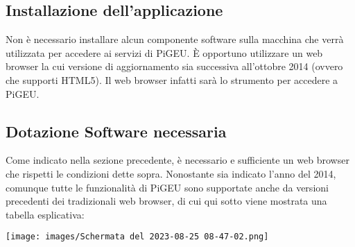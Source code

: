 \documentclass{article}
\begin{document}
    \subsection{Installazione dell'applicazione}
    Non è necessario installare alcun componente software sulla macchina che verrà utilizzata per accedere ai servizi di PiGEU. È opportuno utilizzare un web browser la cui versione di aggiornamento sia successiva all'ottobre 2014 (ovvero che supporti HTML5). Il web browser infatti sarà lo strumento per accedere a PiGEU.
    \subsection{Dotazione Software necessaria}
    Come indicato nella sezione precedente, è necessario e sufficiente un web browser che rispetti le condizioni dette sopra. Nonostante sia indicato l'anno del 2014, comunque tutte le funzionalità di PiGEU sono supportate anche da versioni precedenti dei tradizionali web browser, di cui qui sotto viene mostrata una tabella esplicativa:

    \texttt{[image: images/Schermata del 2023-08-25 08-47-02.png]}
\end{document}
